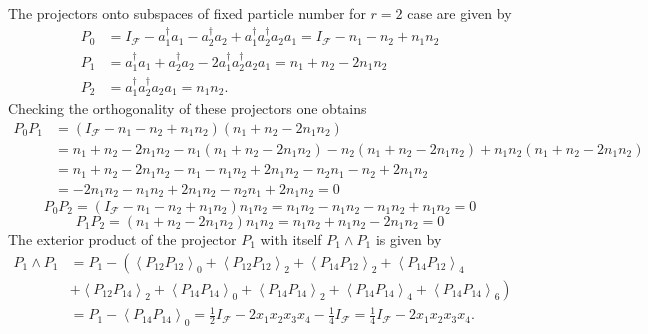 \documentclass[aps,preprint]{revtex4}%
\begin{document}
The projectors onto subspaces of fixed particle number for $r=2$ case are
given by
\begin{align}
P_{0} &  =I_{\mathcal{F}}-a_{1}^{\dagger}a_{1}-a_{2}^{\dagger}a_{2}%
+a_{1}^{\dagger}a_{2}^{\dagger}a_{2}a_{1}=I_{\mathcal{F}}-n_{1}-n_{2}%
+n_{1}n_{2}\\
P_{1} &  =a_{1}^{\dagger}a_{1}+a_{2}^{\dagger}a_{2}-2a_{1}^{\dagger}%
a_{2}^{\dagger}a_{2}a_{1}=n_{1}+n_{2}-2n_{1}n_{2}\\
P_{2} &  =a_{1}^{\dagger}a_{2}^{\dagger}a_{2}a_{1}=n_{1}n_{2}.
\end{align}
Checking the orthogonality of these projectors one obtains
\begin{align*}
P_{0}P_{1} &  =\left(  I_{\mathcal{F}}-n_{1}-n_{2}+n_{1}n_{2}\right)  \left(
n_{1}+n_{2}-2n_{1}n_{2}\right)  \\
&  =n_{1}+n_{2}-2n_{1}n_{2}-n_{1}\left(  n_{1}+n_{2}-2n_{1}n_{2}\right)
-n_{2}\left(  n_{1}+n_{2}-2n_{1}n_{2}\right)  +n_{1}n_{2}\left(  n_{1}%
+n_{2}-2n_{1}n_{2}\right)  \\
&  =n_{1}+n_{2}-2n_{1}n_{2}-n_{1}-n_{1}n_{2}+2n_{1}n_{2}-n_{2}n_{1}%
-n_{2}+2n_{1}n_{2}\\
&  =-2n_{1}n_{2}-n_{1}n_{2}+2n_{1}n_{2}-n_{2}n_{1}+2n_{1}n_{2}=0
\end{align*}%
\begin{equation}
P_{0}P_{2}=\left(  I_{\mathcal{F}}-n_{1}-n_{2}+n_{1}n_{2}\right)  n_{1}%
n_{2}=n_{1}n_{2}-n_{1}n_{2}-n_{1}n_{2}+n_{1}n_{2}=0
\end{equation}%
\begin{equation}
P_{1}P_{2}=\left(  n_{1}+n_{2}-2n_{1}n_{2}\right)  n_{1}n_{2}=n_{1}n_{2}%
+n_{1}n_{2}-2n_{1}n_{2}=0
\end{equation}
The exterior product of the projector $P_{1}$ with itself $P_{1}\wedge P_{1}$
is given by
\begin{align}
P_{1}\wedge P_{1} &  =P_{1}-\left(  \left\langle P_{12}P_{12}\right\rangle
_{0}+\left\langle P_{12}P_{12}\right\rangle _{2}+\left\langle P_{14}%
P_{12}\right\rangle _{2}+\left\langle P_{14}P_{12}\right\rangle _{4}\right.
\\
&  +\left.  \left\langle P_{12}P_{14}\right\rangle _{2}+\left\langle
P_{14}P_{14}\right\rangle _{0}+\left\langle P_{14}P_{14}\right\rangle
_{2}+\left\langle P_{14}P_{14}\right\rangle _{4}+\left\langle P_{14}%
P_{14}\right\rangle _{6}\right)  \\
&  =P_{1}-\left\langle P_{14}P_{14}\right\rangle _{0}=\frac{1}{2}%
I_{\mathcal{F}}-2x_{1}x_{2}x_{3}x_{4}-\frac{1}{4}I_{\mathcal{F}}=\frac{1}%
{4}I_{\mathcal{F}}-2x_{1}x_{2}x_{3}x_{4}.
\end{align}
\end{document}
